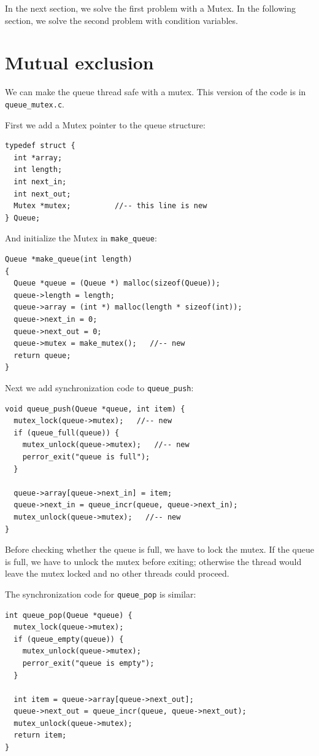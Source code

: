 \documentclass[12pt]{book}
\begin{document}
In the next section, we solve the first problem with a Mutex.
In the following section, we solve the second problem with condition
variables.


\section{Mutual exclusion}

We can make the queue thread safe with a mutex.  This version
of the code is in \verb"queue_mutex.c".

First we add a Mutex pointer to the queue structure:

\begin{verbatim}
typedef struct {
  int *array;
  int length;
  int next_in;
  int next_out;
  Mutex *mutex;          //-- this line is new
} Queue;
\end{verbatim}

And initialize the Mutex in \verb"make_queue":

\begin{verbatim}
Queue *make_queue(int length)
{
  Queue *queue = (Queue *) malloc(sizeof(Queue));
  queue->length = length;
  queue->array = (int *) malloc(length * sizeof(int));
  queue->next_in = 0;
  queue->next_out = 0;
  queue->mutex = make_mutex();   //-- new
  return queue;
}
\end{verbatim}

Next we add synchronization code to \verb"queue_push":

\begin{verbatim}
void queue_push(Queue *queue, int item) {
  mutex_lock(queue->mutex);   //-- new
  if (queue_full(queue)) {
    mutex_unlock(queue->mutex);   //-- new
    perror_exit("queue is full");
  }
  
  queue->array[queue->next_in] = item;
  queue->next_in = queue_incr(queue, queue->next_in);
  mutex_unlock(queue->mutex);   //-- new
}
\end{verbatim}

Before checking whether the queue is full, we have to lock
the mutex.  If the queue is full, we have to unlock
the mutex before exiting; otherwise the thread would leave
the mutex locked and no other threads could proceed.

The synchronization code for \verb"queue_pop" is similar:

\begin{verbatim}
int queue_pop(Queue *queue) {
  mutex_lock(queue->mutex);
  if (queue_empty(queue)) {
    mutex_unlock(queue->mutex);
    perror_exit("queue is empty");
  }
  
  int item = queue->array[queue->next_out];
  queue->next_out = queue_incr(queue, queue->next_out);
  mutex_unlock(queue->mutex);
  return item;
}
\end{verbatim}
\end{document}
